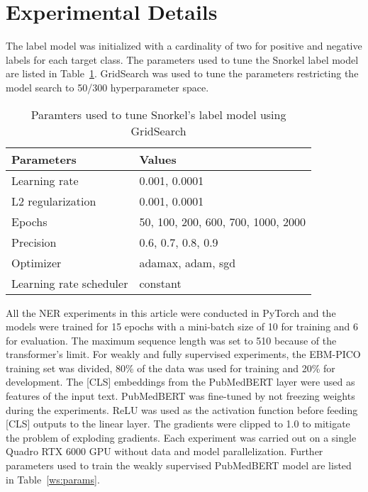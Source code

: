 \documentclass[10.7pt,]{article}
\begin{document}
\section{Experimental Details}\label{params}
%
The label model was initialized with a cardinality of two for positive and negative labels for each target class. 
The parameters used to tune the Snorkel label model are listed in Table~\ref{lm:params}.
GridSearch was used to tune the parameters restricting the model search to 50/300 hyperparameter space.
%
\begin{table}[ht]
\centering
\begin{tabular}{|l|l|}
\hline
Parameters               & Values                              \\
\hline
Learning rate           & 0.001, 0.0001                      \\
L2 regularization       & 0.001, 0.0001                      \\
Epochs                  & 50, 100, 200, 600, 700, 1000, 2000 \\
Precision               & 0.6, 0.7, 0.8, 0.9                 \\
Optimizer               & adamax, adam, sgd                  \\
Learning rate scheduler & constant                           \\
\hline
\end{tabular}
\caption{\label{lm:params} Paramters used to tune Snorkel's label model using GridSearch}
\end{table}
% 
%
%
All the NER experiments in this article were conducted in PyTorch and the models were trained for 15 epochs with a mini-batch size of 10 for training and 6 for evaluation.
The maximum sequence length was set to 510 because of the transformer's limit.
For weakly and fully supervised experiments, the EBM-PICO training set was divided, 80\% of the data was used for training and 20\% for development.
The [CLS] embeddings from the PubMedBERT layer were used as features of the input text.
PubMedBERT was fine-tuned by not freezing weights during the experiments.
ReLU was used as the activation function before feeding [CLS] outputs to the linear layer.
The gradients were clipped to 1.0 to mitigate the problem of exploding gradients.
Each experiment was carried out on a single Quadro RTX 6000 GPU without data and model parallelization.
Further parameters used to train the weakly supervised PubMedBERT model are listed in Table~\ref{ws:params}.
%
\end{document}
